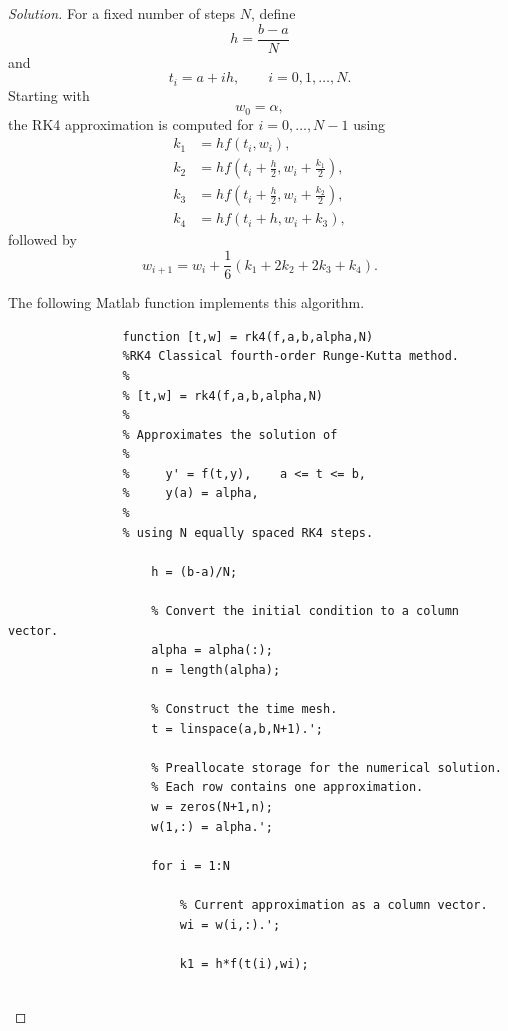 \documentclass[12pt]{amsart}
\newenvironment{solution}
{\begin{proof}[Solution]}
{\end{proof}}
\begin{document}
\begin{onehalfspace}
\begin{solution}
            For a fixed number of steps \(N\), define
            \[
                h=\frac{b-a}{N}
            \]
            and
            \[
                t_i=a+ih,\qquad i=0,1,\ldots,N.
            \]
            Starting with
            \[
                w_0=\alpha,
            \]
            the RK4 approximation is computed for \(i=0,\ldots,N-1\) using
            \begin{align*}
                k_1 &= h f(t_i,w_i),\\
                k_2 &= h f\left(t_i+\frac{h}{2},
                w_i+\frac{k_1}{2}\right),\\
                k_3 &= h f\left(t_i+\frac{h}{2},
                w_i+\frac{k_2}{2}\right),\\
                k_4 &= h f(t_i+h,w_i+k_3),
            \end{align*}
            followed by
            \[
                w_{i+1}
                =
                w_i+\frac{1}{6}\left(k_1+2k_2+2k_3+k_4\right).
            \]

            The following Matlab function implements this algorithm.

            \begin{lstlisting}
                function [t,w] = rk4(f,a,b,alpha,N)
                %RK4 Classical fourth-order Runge-Kutta method.
                %
                % [t,w] = rk4(f,a,b,alpha,N)
                %
                % Approximates the solution of
                %
                %     y' = f(t,y),    a <= t <= b,
                %     y(a) = alpha,
                %
                % using N equally spaced RK4 steps.

                    h = (b-a)/N;

                    % Convert the initial condition to a column vector.
                    alpha = alpha(:);
                    n = length(alpha);

                    % Construct the time mesh.
                    t = linspace(a,b,N+1).';

                    % Preallocate storage for the numerical solution.
                    % Each row contains one approximation.
                    w = zeros(N+1,n);
                    w(1,:) = alpha.';

                    for i = 1:N

                        % Current approximation as a column vector.
                        wi = w(i,:).';

                        k1 = h*f(t(i),wi);


\end{lstlisting}
\end{solution}
\end{onehalfspace}
\end{document}
